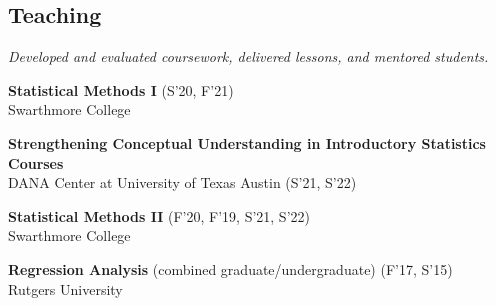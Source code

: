 \documentclass[margin,line]{res}
\newenvironment{list1}{
  \begin{list}{\ding{113}}{%
      \setlength{\itemsep}{0in}
      \setlength{\parsep}{0in} \setlength{\parskip}{0in}
      \setlength{\topsep}{0in} \setlength{\partopsep}{0in} 
      \setlength{\leftmargin}{0.17in}}}{\end{list}}
\begin{document}
\begin{resume}
\subsection{Teaching}
\vspace{-.7cm}
{\it Developed and evaluated coursework, delivered lessons, and mentored students.}
\vspace*{1mm}
\begin{list1}
\item[] {\bf Statistical Methods I} \hfill (S'20, F'21)\\
Swarthmore College
\vspace*{2mm}
\item[] {\bf Strengthening Conceptual Understanding in Introductory Statistics Courses}\\
DANA Center at University of Texas Austin \hfill(S'21, S'22)
\vspace*{2mm}
\item[] {\bf Statistical Methods II} \hfill (F'20, F'19, S'21, S'22)\\
Swarthmore College
\vspace*{2mm}
\item[] {\bf Regression Analysis} (combined graduate/undergraduate) \hfill (F'17, S'15)\\
Rutgers University
\end{list1}

\vspace*{-0.7cm}

\end{resume}
\end{document}
